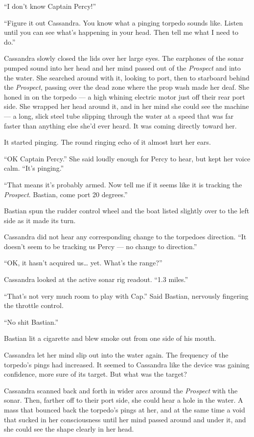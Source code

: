 \documentclass[
]{scrbook}
\begin{document}
``I don't know Captain Percy!''

``Figure it out Cassandra. You know what a pinging torpedo sounds like.
Listen until you can see what's happening in your head. Then tell me
what I need to do.''

Cassandra slowly closed the lids over her large eyes. The earphones of
the sonar pumped sound into her head and her mind passed out of the
\emph{Prospect} and into the water. She searched around with it, looking
to port, then to starboard behind the \emph{Prospect}, passing over the
dead zone where the prop wash made her deaf. She honed in on the torpedo
--- a high whining electric motor just off their rear port side. She
wrapped her head around it, and in her mind she could see the machine
--- a long, slick steel tube slipping through the water at a speed that
was far faster than anything else she'd ever heard. It was coming
directly toward her.

It started pinging. The round ringing echo of it almost hurt her ears.

``OK Captain Percy.'' She said loudly enough for Percy to hear, but kept
her voice calm. ``It's pinging.''

``That means it's probably armed. Now tell me if it seems like it is
tracking the \emph{Prospect}. Bastian, come port 20 degrees.''

Bastian spun the rudder control wheel and the boat listed slightly over
to the left side as it made its turn.

Cassandra did not hear any corresponding change to the torpedoes
direction. ``It doesn't seem to be tracking us Percy --- no change to
direction.''

``OK, it hasn't acquired us\ldots{} yet. What's the range?''

Cassandra looked at the active sonar rig readout. ``1.3 miles.''

``That's not very much room to play with Cap.'' Said Bastian, nervously
fingering the throttle control.

``No shit Bastian.''

Bastian lit a cigarette and blew smoke out from one side of his mouth.

Cassandra let her mind slip out into the water again. The frequency of
the torpedo's pings had increased. It seemed to Cassandra like the
device was gaining confidence, more sure of its target. But what was the
target?

Cassandra scanned back and forth in wider arcs around the
\emph{Prospect} with the sonar. Then, farther off to their port side,
she could hear a hole in the water. A mass that bounced back the
torpedo's pings at her, and at the same time a void that sucked in her
consciousness until her mind passed around and under it, and she could
see the shape clearly in her head.
\end{document}
